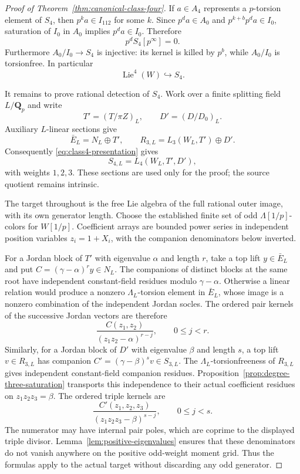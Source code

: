 \documentclass[11pt]{article}
\theoremstyle{definition}\newtheorem{definition}[theorem]{Definition}
\begin{document}
\begin{proof}[Proof of Theorem~\ref{thm:canonical-class-four}]
If $a\in A_4$ represents a $p$-torsion element of $S_4$,
then $p^ka\in I_{112}$ for some $k$. Since
$p^da\in A_0$ and $p^{k+b}p^da\in I_0$, saturation
of $I_0$ in $A_0$ implies $p^da\in I_0$. Therefore
\begin{equation}\label{eq:class4-pbound}
                           p^dS_4[p^\infty]=0.
\end{equation}
Furthermore $A_0/I_0\to S_4$ is injective: its kernel
is killed by $p^b$, while $A_0/I_0$ is torsionfree.
In particular
\begin{equation}\label{eq:class4-pure-Hall}
                  \operatorname{Lie}^4(W)\hookrightarrow S_4.
\end{equation}

It remains to prove rational detection of $S_4$.
Work over a finite splitting field $L/\mathbf Q_p$ and
write
\[
 T'=(T/\pi Z)_L,\qquad D'=(D/D_0)_L.
\]
Auxiliary $L$-linear sections give
\[
 \bar E_L=N_L\oplus T',\qquad
 R_{3,L}=L_3(W_L,T')\oplus D'.
\]
Consequently \eqref{eq:class4-presentation} gives
\begin{equation}\label{eq:class4-weighted-free}
                        S_{4,L}=L_4(W_L,T',D'),
\end{equation}
with weights $1,2,3$. These sections are used only for
the proof; the source quotient remains intrinsic.

The target throughout is the free Lie algebra of the
full rational outer image, with its own generator
length. Choose the established finite set of odd
$\Lambda[1/p]$-colors for $W[1/p]$. Coefficient arrays
are bounded power series in independent position
variables $z_i=1+X_i$, with the companion denominators
below inverted.

For a Jordan block of $T'$ with eigenvalue $\alpha$
and length $r$, take a top lift $y\in\bar E_L$ and put
$C=(\gamma-\alpha)^ry\in N_L$. The companions of
distinct blocks at the same root have independent
constant-field residues modulo $\gamma-\alpha$.
Otherwise a linear relation would produce a nonzero
$\Lambda_L$-torsion element in $\bar E_L$, whose image
is a nonzero combination of the independent Jordan
socles. The ordered pair kernels of the successive
Jordan vectors are therefore
\[
              \frac{C(z_1,z_2)}{(z_1z_2-\alpha)^{r-j}},
              \qquad 0\le j<r.
\]
Similarly, for a Jordan block of $D'$ with eigenvalue
$\beta$ and length $s$, a top lift $v\in R_{3,L}$ has
companion $C'=(\gamma-\beta)^sv\in S_{3,L}$.
The $\Lambda_L$-torsionfreeness of $R_{3,L}$ gives
independent constant-field companion residues.
Proposition~\ref{prop:degree-three-saturation} transports
this independence to their actual coefficient residues
on $z_1z_2z_3=\beta$. The ordered triple kernels are
\[
        \frac{C'(z_1,z_2,z_3)}{(z_1z_2z_3-\beta)^{s-j}},
                         \qquad0\le j<s.
\]
The numerator may have internal pair poles, which are
coprime to the displayed triple divisor.
Lemma~\ref{lem:positive-eigenvalues} ensures that these
denominators do not vanish anywhere on the positive
odd-weight moment grid. Thus the formulas apply to
the actual target without discarding any odd generator.


\end{proof}
\end{document}
